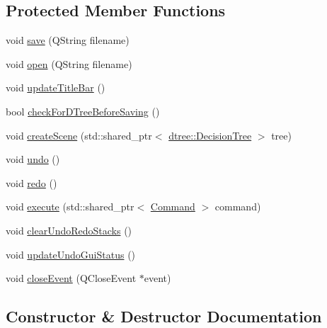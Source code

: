 \subsection*{Protected Member Functions}
\begin{DoxyCompactItemize}
\item 
void \mbox{\hyperlink{class_dt_editor_window_a5788c87ca0e893c0d60cc866d50b065b}{save}} (Q\+String filename)
\item 
void \mbox{\hyperlink{class_dt_editor_window_afe4694a03730635f386fc4271ddb50f7}{open}} (Q\+String filename)
\item 
void \mbox{\hyperlink{class_dt_editor_window_a3d3195899ad3cbbf8c9fc5f3ee2ccf6d}{update\+Title\+Bar}} ()
\item 
bool \mbox{\hyperlink{class_dt_editor_window_a12b72477540c9a5f9b261dd46ec865ae}{check\+For\+D\+Tree\+Before\+Saving}} ()
\item 
void \mbox{\hyperlink{class_dt_editor_window_ae45d5775844c3cc795b70e5a97e682a7}{create\+Scene}} (std\+::shared\+\_\+ptr$<$ \mbox{\hyperlink{classdtree_1_1_decision_tree}{dtree\+::\+Decision\+Tree}} $>$ tree)
\item 
void \mbox{\hyperlink{class_dt_editor_window_a778de6912976dad3734821938e5a4058}{undo}} ()
\item 
void \mbox{\hyperlink{class_dt_editor_window_a14790e0d43a17db238e7c73690796d28}{redo}} ()
\item 
void \mbox{\hyperlink{class_dt_editor_window_ab7a3269c8ed4eb4d81f39246cc3c4dbb}{execute}} (std\+::shared\+\_\+ptr$<$ \mbox{\hyperlink{class_command}{Command}} $>$ command)
\item 
void \mbox{\hyperlink{class_dt_editor_window_ae3b30ca62f07f0d8e731ecb3c425a679}{clear\+Undo\+Redo\+Stacks}} ()
\item 
void \mbox{\hyperlink{class_dt_editor_window_a502ffef938d35087b00cc1728a294997}{update\+Undo\+Gui\+Status}} ()
\item 
void \mbox{\hyperlink{class_dt_editor_window_aafce6f85dd9803cca88d982226ad37aa}{close\+Event}} (Q\+Close\+Event $\ast$event)
\end{DoxyCompactItemize}


\subsection{Constructor \& Destructor Documentation}
\mbox{\label{class_dt_editor_window_a667a7c1012a535991d7e6d9a81f9b560}} 
